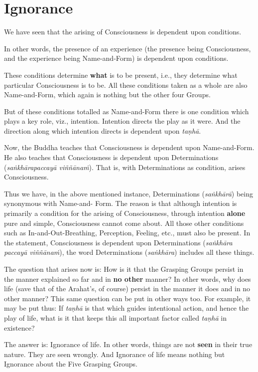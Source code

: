 \chapter{Ignorance}

We have seen that the arising of Consciousness is dependent upon conditions.

In other words, the presence of an experience (the presence being Consciousness, and the experience being Name-and-Form) is dependent upon conditions.

These conditions determine \textbf{what} is to be present, i.e., they determine what particular Consciousness is to be. All these conditions taken as a whole are also Name-and-Form, which again is nothing but the other four Groups.

But of these conditions totalled as Name-and-Form there is one condition which plays a key role, viz., intention. Intention directs the play as it were. And the direction along which intention directs is dependent upon \emph{taṇhā}.

Now, the Buddha teaches that Consciousness is dependent upon Name-and-Form. He also teaches that Consciousness is dependent upon Determinations (\emph{saṅkhārapaccayā viññānaṁ}). That is, with Determinations as condition, arises Consciousness.

Thus we have, in the above mentioned instance, Determinations (\emph{saṅkhārā}) being synonymous with Name-and- Form. The reason is that although intention is primarily a condition for the arising of Consciousness, through intention \textbf{alone} pure and simple, Consciousness cannot come about. All those other conditions such as In-and-Out-Breathing, Perception, Feeling, etc., must also be present. In the statement, Consciousness is dependent upon Determinations (\emph{saṅkhāra paccayā viññānaṁ}), the word Determinations (\emph{saṅkhāra}) includes all these things.

The question that arises now is: How is it that the Grasping Groups persist in the manner explained so far and in \textbf{no other} manner? In other words, why does life (save that of the Arahat's, of course) persist in the manner it does and in no other manner? This same question can be put in other ways too. For example, it may be put thus: If \emph{taṇhā} is that which guides intentional action, and hence the play of life, what is it that keeps this all important factor called \emph{taṇhā} in existence?

The answer is: Ignorance of life. In other words, things are not \textbf{seen} in their true nature. They are seen wrongly. And Ignorance of life means nothing but Ignorance about the Five Grasping Groups.

